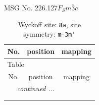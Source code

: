 \documentclass[fleqn,8pt]{jsarticle}
\begin{document}
\setcounter{MaxMatrixCols}{32}

\renewcommand{\tablename}{Table~}
\renewcommand{\figurename}{Figure~}
\begin{center}
\LARGE
MSG No. 226.127\quad$F_{S}m\bar{3}c$
\end{center}
\renewcommand{\arraystretch}{1.2}
\begin{longtable}{ccc}
\caption{Wyckoff site: {\tt 8a}, site symmetry: {\tt m-3m'}}
 \\
 \hline \hline
No. & position & mapping \\ \hline \endfirsthead

\multicolumn{2}{l}{\tablename\ \thetable{}} \\
 \hline \hline
No. & position & mapping \\ \hline \endhead

 \hline \hline
\multicolumn{2}{r}{\footnotesize\it continued ...} \\ \endfoot

 \hline \hline
\multicolumn{2}{r}{} \\ \endlastfoot


\end{longtable}
\end{document}
